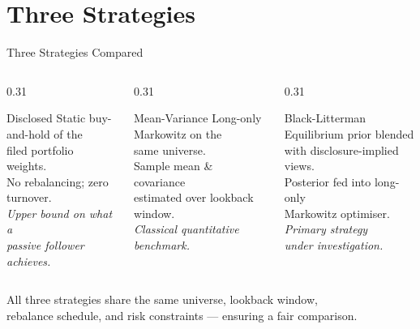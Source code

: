 \documentclass[aspectratio=169, 10pt]{beamer}
\begin{document}
\section{Three Strategies}

\begin{frame}{Three Strategies Compared}

  \begin{columns}[T]
    \begin{column}{0.31\textwidth}
      \begin{block}{\centering Disclosed}
        \centering\small
        Static buy-and-hold of the\\
        filed portfolio weights.\\[6pt]
        No rebalancing; zero turnover.\\[6pt]
        \textit{Upper bound on what a\\
        passive follower achieves.}
      \end{block}
    \end{column}

    \begin{column}{0.31\textwidth}
      \begin{block}{\centering Mean-Variance}
        \centering\small
        Long-only Markowitz on the\\
        same universe.\\[6pt]
        Sample mean \& covariance\\
        estimated over lookback window.\\[6pt]
        \textit{Classical quantitative\\
        benchmark.}
      \end{block}
    \end{column}

    \begin{column}{0.31\textwidth}
      \begin{alertblock}{\centering Black-Litterman}
        \centering\small
        Equilibrium prior blended\\
        with disclosure-implied views.\\[6pt]
        Posterior fed into long-only\\
        Markowitz optimiser.\\[6pt]
        \textit{Primary strategy\\
        under investigation.}
      \end{alertblock}
    \end{column}
  \end{columns}

  \bigskip
  \begin{center}
    \small All three strategies share the same universe, lookback window,\\
    rebalance schedule, and risk constraints — ensuring a fair comparison.
  \end{center}
\end{frame}
\end{document}
